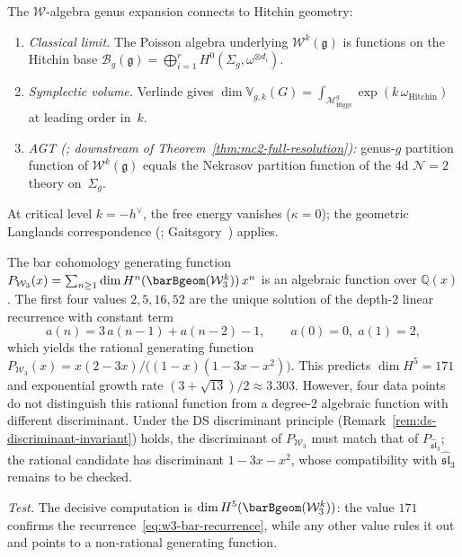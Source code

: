 \begin{remark}
The $\mathcal{W}$-algebra genus expansion connects to Hitchin geometry:
\begin{enumerate}[label=\textup{(\roman*)}]
\item \emph{Classical limit.} The Poisson algebra underlying $\mathcal{W}^k(\mathfrak{g})$ is functions on the Hitchin base $\mathcal{B}_g(\mathfrak{g}) = \bigoplus_{i=1}^r H^0(\Sigma_g, \omega^{\otimes d_i})$.
\item \emph{Symplectic volume.} Verlinde gives $\dim \mathbb{V}_{g,k}(G) = \int_{\mathcal{M}_{\mathrm{Higgs}}^g} \exp(k\,\omega_{\mathrm{Hitchin}})$ at leading order in~$k$.
\item \emph{AGT \textup{(\ClaimStatusConjectured; downstream of Theorem~\ref{thm:mc2-full-resolution})}:} genus-$g$ partition function of $\mathcal{W}^k(\mathfrak{g})$ equals the Nekrasov partition function of the $4$d $\mathcal{N}=2$ theory on~$\Sigma_g$.
\end{enumerate}
At critical level $k = -h^\vee$, the free energy vanishes ($\kappa = 0$); the geometric Langlands correspondence (\ClaimStatusProvedElsewhere; Gaitsgory~\cite{Gai19}) applies.
\end{remark}

\begin{conjecture}
\label{conj:w3-algebraicity}
The bar cohomology generating function $P_{\mathcal{W}_3}(x) = \sum_{n \geq 1} \dim H^n(\barBgeom(\mathcal{W}_3^k))\, x^n$ is an algebraic function over $\mathbb{Q}(x)$. The first four values $2, 5, 16, 52$ are the unique solution of the depth-$2$ linear recurrence with constant term
\begin{equation}\label{eq:w3-bar-recurrence}
a(n) = 3\,a(n{-}1) + a(n{-}2) - 1, \qquad a(0) = 0,\; a(1) = 2,
\end{equation}
which yields the rational generating function
$P_{\mathcal{W}_3}(x) = x(2-3x)/\bigl((1-x)(1-3x-x^2)\bigr)$.
This predicts $\dim H^5 = 171$ and exponential growth rate
$(3+\sqrt{13})/2 \approx 3.303$.
However, four data points do not distinguish this rational function
from a degree-$2$ algebraic function with different discriminant.
Under the DS discriminant principle
(Remark~\ref{rem:ds-discriminant-invariant}) holds,
the discriminant of $P_{\mathcal{W}_3}$ must match that of
$P_{\widehat{\mathfrak{sl}}_3}$; the rational candidate has
discriminant $1 - 3x - x^2$, whose compatibility with
$\widehat{\mathfrak{sl}}_3$ remains to be checked.

\emph{Test.} The decisive computation is
$\dim H^5(\barBgeom(\mathcal{W}_3^k))$: the value $171$
confirms the recurrence~\eqref{eq:w3-bar-recurrence}, while any
other value rules it out and points to a non-rational generating
function.
\end{conjecture}

